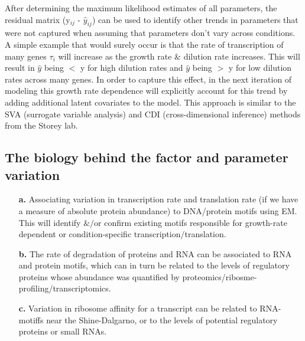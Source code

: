 \documentclass[12pt]{article}
\begin{document}
After determining the maximum likelihood estimates of all parameters, the residual matrix (y$_{ij}$ - $\hat{y}_{ij}$) can be used to identify other trends in parameters that were not captured when assuming that parameters don't vary across conditions.  A simple example that would surely occur is that the rate of transcription of many genes $\tau_{i}$ will increase as the growth rate $\&$ dilution rate increases.  This will result in $\hat{y}$ being $<$ y for high dilution rates and $\hat{y}$ being $>$ y for low dilution rates across many genes.  In order to capture this effect, in the next iteration of modeling this growth rate dependence will explicitly account for this trend by adding additional latent covariates to the model.  This approach is similar to the SVA (surrogate variable analysis) and CDI (cross-dimensional inference) methods from the Storey lab.  


\clearpage
\subsection*{The biology behind the factor and parameter variation}

\begin{itemize}

\item[\textbf{a.}] Associating variation in transcription rate and translation rate (if we have a measure of absolute protein abundance) to DNA/protein motifs using EM.  This will identify $\&/$or confirm existing motifs responsible for growth-rate dependent or condition-specific transcription$/$translation.

\item[\textbf{b.}] The rate of degradation of proteins and RNA can be associated to RNA and protein motifs, which can in turn be related to the levels of regulatory proteins whose abundance was quantified by proteomics/ribosme-profiling/transcriptomics.

\item[\textbf{c.}] Variation in ribosome affinity for a transcript can be related to RNA-motiffs near the Shine-Dalgarno, or to the levels of potential regulatory proteins or small RNAs.

\end{itemize}
\end{document}

